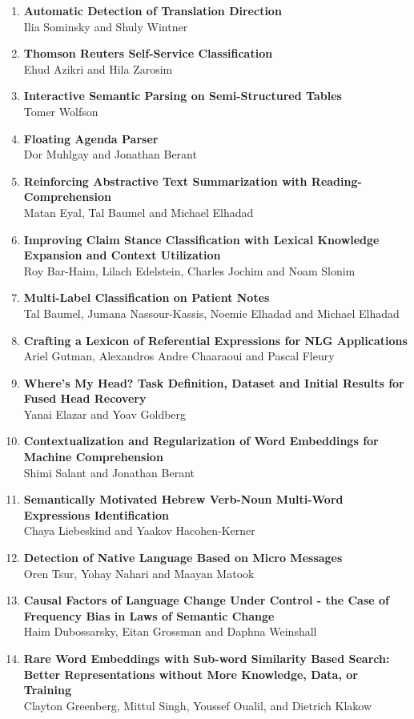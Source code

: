 \documentclass[a0,portrait]{a0poster}
\begin{document}
{\begin{multicols}{5}
\begin{enumerate}
Gabriel Stanovsky, Daniel Gruhl and Pablo Mendes
\item
\textbf{Automatic Detection of Translation Direction}\\
Ilia Sominsky and Shuly Wintner
\item
\textbf{Thomson Reuters Self-Service Classification}\\
Ehud Azikri and Hila Zarosim
\item
\textbf{Interactive Semantic Parsing on Semi-Structured Tables}\\
Tomer Wolfson
\item
\textbf{Floating Agenda Parser}\\
Dor Muhlgay and Jonathan Berant
\item
\textbf{Reinforcing Abstractive Text Summarization with
Reading-Comprehension}\\
Matan Eyal, Tal Baumel and Michael Elhadad
\item
\textbf{Improving Claim Stance Classification with Lexical Knowledge
Expansion and Context Utilization}\\
Roy Bar-Haim, Lilach Edelstein, Charles Jochim and Noam Slonim
\item
\textbf{Multi-Label Classification on Patient Notes}\\
Tal Baumel, Jumana Nassour-Kassis, Noemie Elhadad and Michael Elhadad
\item
\textbf{Crafting a Lexicon of Referential Expressions for NLG Applications}\\
Ariel Gutman, Alexandros Andre Chaaraoui and Pascal Fleury
\item
\textbf{Where's My Head?
Task Definition, Dataset and Initial Results for Fused Head Recovery}\\
Yanai Elazar and Yoav Goldberg
\item
\textbf{Contextualization and Regularization of Word Embeddings for
Machine Comprehension}\\
Shimi Salant and Jonathan Berant
\item
\textbf{Semantically Motivated Hebrew Verb-Noun Multi-Word Expressions
Identification}\\
Chaya Liebeskind and Yaakov Hacohen-Kerner
\item
\textbf{Detection of Native Language Based on Micro Messages}\\
Oren Tsur, Yohay Nahari and Maayan Matook
\item
\textbf{Causal Factors of Language Change Under Control - the Case of Frequency Bias in Laws of Semantic
Change}\\
Haim Dubossarsky, Eitan Grossman and Daphna Weinshall
\item
\textbf{Rare Word Embeddings with Sub-word Similarity Based Search: Better Representations without More
Knowledge, Data, or Training}\\
Clayton Greenberg, Mittul Singh, Youssef Oualil, and Dietrich Klakow
\end{enumerate}
\end{multicols}
}
\end{document}
